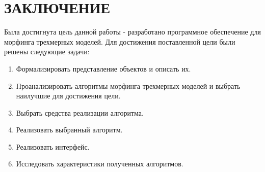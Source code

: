 \chapter*{ЗАКЛЮЧЕНИЕ}

Была достигнута цель данной работы - разработано программное обеспечение для морфинга трехмерных моделей. 
Для достижения поставленной цели были решены следующие задачи:
\begin{enumerate}
	\item Формализировать представление объектов и описать их.
	\item Проанализировать алгоритмы морфинга трехмерных моделей и выбрать наилучшие для достижения цели.
	\item Выбрать средства реализации алгоритма.
	\item Реализовать выбранный алгоритм.
	\item Реализовать интерфейс.
	\item Исследовать характеристики полученных алгоритмов.
\end{enumerate}